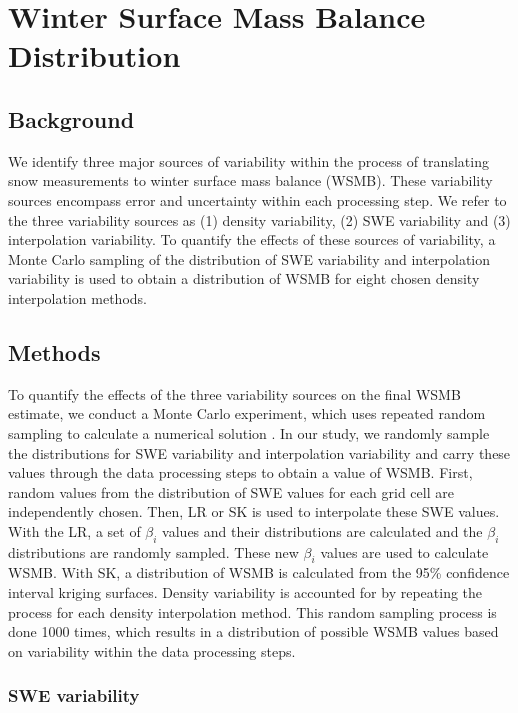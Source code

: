 \documentclass[12pt]{article}
\begin{document}
\section{Winter Surface Mass Balance Distribution}
\label{sec:WSMBdistribution}

\subsection{Background}

We identify three major sources of variability within the process of translating snow measurements to winter surface mass balance (WSMB). These variability sources encompass error and uncertainty within each processing step. We refer to the three variability sources as (1) density variability, (2) SWE variability and (3) interpolation variability. To quantify the effects of these sources of variability, a Monte Carlo sampling of the distribution of SWE variability and interpolation variability is used to obtain a distribution of WSMB for eight chosen density interpolation methods.  

\subsection{Methods}

To quantify the effects of the three variability sources on the final WSMB estimate, we conduct a Monte Carlo experiment, which uses repeated random sampling to calculate a numerical solution \citep{Metropolis1949}. In our study, we randomly sample the distributions for SWE variability and interpolation variability and carry these values through the data processing steps to obtain a value of WSMB. First, random values from the distribution of SWE values for each grid cell are independently chosen. Then, LR or SK is used to interpolate these SWE values. With the LR, a set of $\beta_i$ values and their distributions are calculated and the $\beta_i$ distributions are randomly sampled. These new $\beta_i$ values are used to calculate WSMB. With SK, a distribution of WSMB is calculated from the 95\% confidence interval kriging surfaces. Density variability is accounted for by repeating the process for each density interpolation method. This random sampling process is done 1000 times, which results in a distribution of possible WSMB values based on variability within the data processing steps.


\subsubsection{SWE variability}
\end{document}
